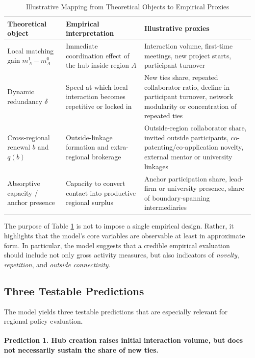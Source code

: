 \begin{table}[htbp]
\centering
\caption{Illustrative Mapping from Theoretical Objects to Empirical Proxies}
\label{tab:proxy_mapping}
\begin{tabular}{p{} p{} p{}}
\toprule
Theoretical object & Empirical interpretation & Illustrative proxies \\
\midrule
Local matching gain $m_A^1-m_A^0$ 
& Immediate coordination effect of the hub inside region $A$ 
& Interaction volume, first-time meetings, new project starts, participant turnover \\

Dynamic redundancy $\delta$ 
& Speed at which local interaction becomes repetitive or locked in 
& New ties share, repeated collaborator ratio, decline in participant turnover, network modularity or concentration of repeated ties \\

Cross-regional renewal $b$ and $q(b)$ 
& Outside-linkage formation and extra-regional brokerage 
& Outside-region collaborator share, invited outside participants, co-patenting/co-application novelty, external mentor or university linkages \\

Absorptive capacity / anchor presence 
& Capacity to convert contact into productive regional surplus 
& Anchor participation share, lead-firm or university presence, share of boundary-spanning intermediaries \\
\bottomrule
\end{tabular}
\end{table}

The purpose of Table \ref{tab:proxy_mapping} is not to impose a single empirical design. Rather, it highlights that the model's core variables are observable at least in approximate form. In particular, the model suggests that a credible empirical evaluation should include not only gross activity measures, but also indicators of \emph{novelty}, \emph{repetition}, and \emph{outside connectivity}.

\subsection{Three Testable Predictions}

The model yields three testable predictions that are especially relevant for regional policy evaluation.

\paragraph{Prediction 1. Hub creation raises initial interaction volume, but does not necessarily sustain the share of new ties.}

